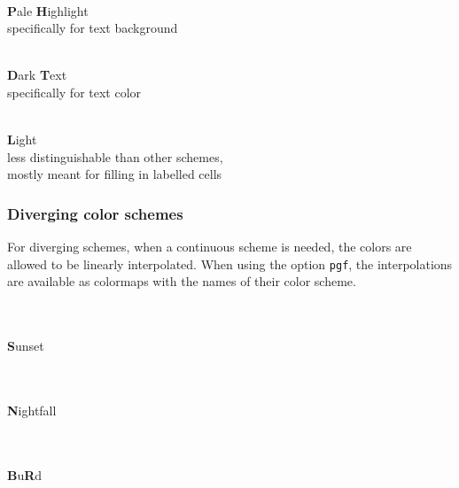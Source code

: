 \documentclass{scrartcl}
\begin{document}
\begin{minipage}{0.5\textwidth}
    \centering
    \\
    \textbf{P}ale \textbf{H}ighlight\\
    specifically for text background
\end{minipage}\hfill%
\begin{minipage}{0.5\textwidth}
    \centering
    \\
    \textbf{D}ark \textbf{T}ext\\
    specifically for text color
\end{minipage}

\begin{center}
    \\
    \textbf{L}ight\\
    less distinguishable than other schemes,\\ mostly meant for filling in labelled cells
\end{center}\clearpage

\subsubsection{Diverging color schemes}\label{sec:T-D}
For diverging schemes, when a continuous scheme is needed, the colors are allowed to be linearly interpolated.
When using the option \texttt{pgf}, the interpolations are available as colormaps with the names of their color scheme.

\begin{center}
    \\
    \\
    \textbf{S}unset
\end{center}

\begin{center}
    \\
    \\
    \textbf{N}ightfall
\end{center}

\begin{center}
    \\
    \\
    \textbf{B}u\textbf{R}d
\end{center}
\end{document}
